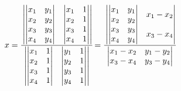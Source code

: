 \begin{align*}
  x &= \cfrac{
      \begin{vmatrix}
        \begin{vmatrix} x_1 & y_1 \\ x_2 & y_2 \end{vmatrix} & \begin{vmatrix} x_1 & 1 \\ x_2 & 1 \end{vmatrix} \\
        \begin{vmatrix} x_3 & y_3 \\ x_4 & y_4 \end{vmatrix} & \begin{vmatrix} x_3 & 1 \\ x_4 & 1 \end{vmatrix} 
      \end{vmatrix}}{
      \begin{vmatrix}
        \begin{vmatrix} x_1 & 1 \\ x_2 & 1 \end{vmatrix} & \begin{vmatrix} y_1 & 1 \\ y_2 & 1 \end{vmatrix} \\
        \begin{vmatrix} x_3 & 1 \\ x_4 & 1 \end{vmatrix} & \begin{vmatrix} y_3 & 1 \\ y_4 & 1 \end{vmatrix} 
      \end{vmatrix}} 
    = \cfrac{
      \begin{vmatrix}
        \begin{vmatrix} x_1 & y_1 \\ x_2 & y_2 \end{vmatrix} & x_1 - x_2 \\
        \begin{vmatrix} x_3 & y_3 \\ x_4 & y_4 \end{vmatrix} & x_3 - x_4 
      \end{vmatrix}}{
      \begin{vmatrix}
        x_1 - x_2 & y_1 - y_2 \\
        x_3 - x_4 & y_3 - y_4 
      \end{vmatrix}}\\

\end{align*}
